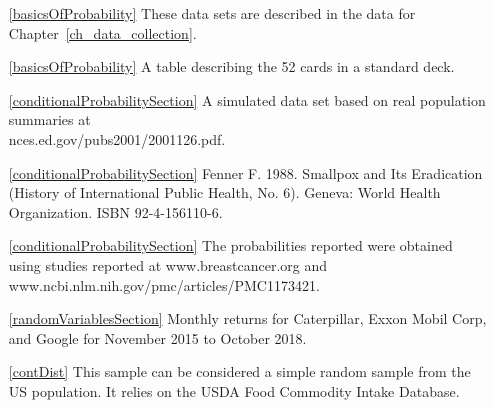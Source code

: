 \begin{itemize}
\item[\ref{basicsOfProbability}]
    These data sets are described in
    the data for Chapter~\ref{ch_data_collection}.
\item[\ref{basicsOfProbability}]
    A table describing the 52 cards in a standard deck.

\item[\ref{conditionalProbabilitySection}]
    A simulated data set based on real population summaries at\\
        {nces.ed.gov/pubs2001/2001126.pdf}.
\item[\ref{conditionalProbabilitySection}]
    Fenner F. 1988.
    Smallpox and Its Eradication
    (History of International Public Health, No. 6).
    Geneva: World Health Organization. ISBN 92-4-156110-6.

\item[\ref{conditionalProbabilitySection}]
    The probabilities reported were obtained using studies
    reported at
        {www.breastcancer.org}
    and 
        {www.ncbi.nlm.nih.gov/pmc/articles/PMC1173421}. 

\item[\ref{randomVariablesSection}]
    Monthly returns for Caterpillar, Exxon Mobil Corp,
    and Google for November 2015 to October 2018.

\item[\ref{contDist}]
    This sample can be considered a simple random sample
    from the US population.
    It relies on the USDA Food Commodity Intake Database.

\end{itemize}





